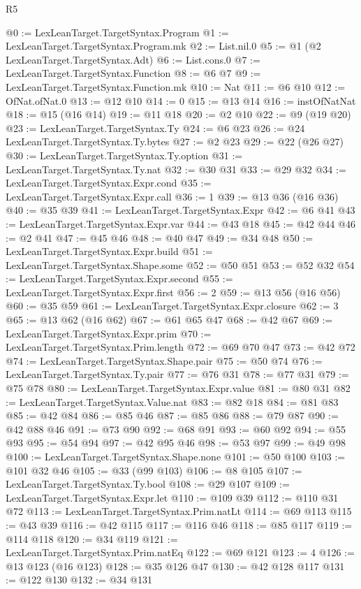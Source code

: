 \begin{lexlean}{R5}
\begin{coremodule}
{{{{{{{{{{{{{{{{{{{@0 := LexLeanTarget.TargetSyntax.Program
@1 := LexLeanTarget.TargetSyntax.Program.mk
@2 := List.nil.{0}
@5 := @1 (@2 LexLeanTarget.TargetSyntax.Adt)
@6 := List.cons.{0}
@7 := LexLeanTarget.TargetSyntax.Function
@8 := @6 @7
@9 := LexLeanTarget.TargetSyntax.Function.mk
@10 := Nat
@11 := @6 @10
@12 := OfNat.ofNat.{0}
@13 := @12 @10
@14 := 0
@15 := @13 @14
@16 := instOfNatNat
@18 := @15 (@16 @14)
@19 := @11 @18
@20 := @2 @10
@22 := @9 (@19 @20)
@23 := LexLeanTarget.TargetSyntax.Ty
@24 := @6 @23
@26 := @24 LexLeanTarget.TargetSyntax.Ty.bytes
@27 := @2 @23
@29 := @22 (@26 @27)
@30 := LexLeanTarget.TargetSyntax.Ty.option
@31 := LexLeanTarget.TargetSyntax.Ty.nat
@32 := @30 @31
@33 := @29 @32
@34 := LexLeanTarget.TargetSyntax.Expr.cond
@35 := LexLeanTarget.TargetSyntax.Expr.call
@36 := 1
@39 := @13 @36 (@16 @36)
@40 := @35 @39
@41 := LexLeanTarget.TargetSyntax.Expr
@42 := @6 @41
@43 := LexLeanTarget.TargetSyntax.Expr.var
@44 := @43 @18
@45 := @42 @44
@46 := @2 @41
@47 := @45 @46
@48 := @40 @47
@49 := @34 @48
@50 := LexLeanTarget.TargetSyntax.Expr.build
@51 := LexLeanTarget.TargetSyntax.Shape.some
@52 := @50 @51
@53 := @52 @32
@54 := LexLeanTarget.TargetSyntax.Expr.second
@55 := LexLeanTarget.TargetSyntax.Expr.first
@56 := 2
@59 := @13 @56 (@16 @56)
@60 := @35 @59
@61 := LexLeanTarget.TargetSyntax.Expr.closure
@62 := 3
@65 := @13 @62 (@16 @62)
@67 := @61 @65 @47
@68 := @42 @67
@69 := LexLeanTarget.TargetSyntax.Expr.prim
@70 := LexLeanTarget.TargetSyntax.Prim.length
@72 := @69 @70 @47
@73 := @42 @72
@74 := LexLeanTarget.TargetSyntax.Shape.pair
@75 := @50 @74
@76 := LexLeanTarget.TargetSyntax.Ty.pair
@77 := @76 @31
@78 := @77 @31
@79 := @75 @78
@80 := LexLeanTarget.TargetSyntax.Expr.value
@81 := @80 @31
@82 := LexLeanTarget.TargetSyntax.Value.nat
@83 := @82 @18
@84 := @81 @83
@85 := @42 @84
@86 := @85 @46
@87 := @85 @86
@88 := @79 @87
@90 := @42 @88 @46
@91 := @73 @90
@92 := @68 @91
@93 := @60 @92
@94 := @55 @93
@95 := @54 @94
@97 := @42 @95 @46
@98 := @53 @97
@99 := @49 @98
@100 := LexLeanTarget.TargetSyntax.Shape.none
@101 := @50 @100
@103 := @101 @32 @46
@105 := @33 (@99 @103)
@106 := @8 @105
@107 := LexLeanTarget.TargetSyntax.Ty.bool
@108 := @29 @107
@109 := LexLeanTarget.TargetSyntax.Expr.let
@110 := @109 @39
@112 := @110 @31 @72
@113 := LexLeanTarget.TargetSyntax.Prim.natLt
@114 := @69 @113
@115 := @43 @39
@116 := @42 @115
@117 := @116 @46
@118 := @85 @117
@119 := @114 @118
@120 := @34 @119
@121 := LexLeanTarget.TargetSyntax.Prim.natEq
@122 := @69 @121
@123 := 4
@126 := @13 @123 (@16 @123)
@128 := @35 @126 @47
@130 := @42 @128 @117
@131 := @122 @130
@132 := @34 @131
}}}}}}}}}}}}}}}}}}}
\end{coremodule}
\end{lexlean}

